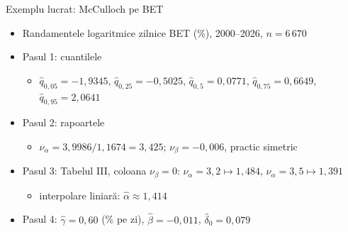 \begin{frame}{Exemplu lucrat: McCulloch pe BET}
\itemsize{\small}
\begin{itemize}
    \item Randamentele logaritmice zilnice BET (\%), 2000--2026, $n = 6\,670$
    \item Pasul 1: cuantilele
    \begin{itemize}
        \item $\hat q_{0{,}05} = -1{,}9345$, $\hat q_{0{,}25} = -0{,}5025$, $\hat q_{0{,}5} = 0{,}0771$, $\hat q_{0{,}75} = 0{,}6649$, $\hat q_{0{,}95} = 2{,}0641$
    \end{itemize}
    \item Pasul 2: rapoartele
    \begin{itemize}
        \item $\nu_\alpha = 3{,}9986/1{,}1674 = 3{,}425$; $\nu_\beta = -0{,}006$, practic simetric
    \end{itemize}
    \item Pasul 3: Tabelul III, coloana $\nu_\beta = 0$: $\nu_\alpha = 3{,}2 \mapsto 1{,}484$, $\nu_\alpha = 3{,}5 \mapsto 1{,}391$
    \begin{itemize}
        \item interpolare liniară: $\hat\alpha \approx 1{,}414$
    \end{itemize}
    \item Pasul 4: $\hat\gamma = 0{,}60$ (\% pe zi), $\hat\beta = -0{,}011$, $\hat\delta_0 = 0{,}079$
\end{itemize}
\end{frame}

